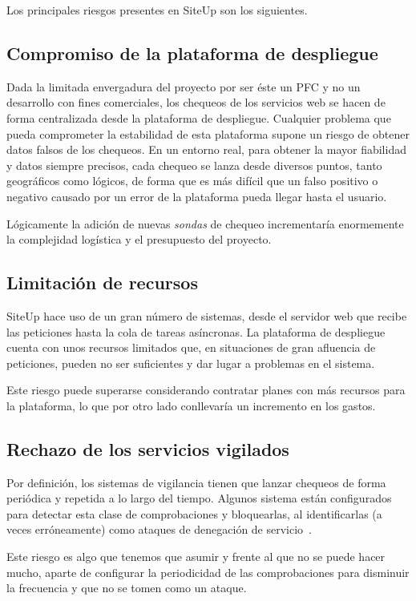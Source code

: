Los principales riesgos presentes en SiteUp son los siguientes.

\subsection{Compromiso de la plataforma de despliegue}
\label{subsec:riesgo-compromiso-plataforma}

Dada la limitada envergadura del proyecto por ser éste un PFC y no un desarrollo
con fines comerciales, los chequeos de los servicios web se hacen de forma
centralizada desde la plataforma de despliegue. Cualquier problema que pueda
comprometer la estabilidad de esta plataforma supone un riesgo de obtener datos
falsos de los chequeos. En un entorno real, para obtener la mayor fiabilidad y
datos siempre precisos, cada chequeo se lanza desde diversos puntos, tanto
geográficos como lógicos, de forma que es más difícil que un falso positivo o
negativo causado por un error de la plataforma pueda llegar hasta el usuario.

Lógicamente la adición de nuevas \textit{sondas} de chequeo incrementaría
enormemente la complejidad logística y el presupuesto del proyecto.

\subsection{Limitación de recursos}

SiteUp hace uso de un gran número de sistemas, desde el servidor web que recibe
las peticiones hasta la cola de tareas asíncronas. La plataforma de despliegue
cuenta con unos recursos limitados que, en situaciones de gran afluencia de
peticiones, pueden no ser suficientes y dar lugar a problemas en el
sistema. 

Este riesgo puede superarse considerando contratar planes con más recursos para
la plataforma, lo que por otro lado conllevaría un incremento en los gastos.

\subsection{Rechazo de los servicios vigilados}

Por definición, los sistemas de vigilancia tienen que lanzar chequeos de forma
periódica y repetida a lo largo del tiempo. Algunos sistema están configurados
para detectar esta clase de comprobaciones y bloquearlas, al identificarlas (a
veces erróneamente) como ataques de denegación de servicio~\cite{ddos}. 

Este riesgo es algo que tenemos que asumir y frente al que no se puede hacer
mucho, aparte de configurar la periodicidad de las comprobaciones para
disminuir la frecuencia y que no se tomen como un ataque.



